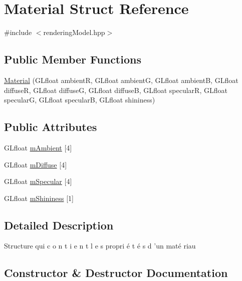 \hypertarget{struct_material}{}\section{Material Struct Reference}
\label{struct_material}


{\ttfamily \#include $<$rendering\+Model.\+hpp$>$}

\subsection*{Public Member Functions}
\begin{DoxyCompactItemize}
\item 
\hyperlink{struct_material_ad2dfa8adf3cec0143e3f804c47588b8c}{Material} (G\+Lfloat ambientR, G\+Lfloat ambientG, G\+Lfloat ambientB, G\+Lfloat diffuseR, G\+Lfloat diffuseG, G\+Lfloat diffuseB, G\+Lfloat specularR, G\+Lfloat specularG, G\+Lfloat specularB, G\+Lfloat shininess)
\end{DoxyCompactItemize}
\subsection*{Public Attributes}
\begin{DoxyCompactItemize}
\item 
G\+Lfloat \hyperlink{struct_material_a9df39adc76f8131ff7c071339bd09eac}{m\+Ambient} \mbox{[}4\mbox{]}
\item 
G\+Lfloat \hyperlink{struct_material_acedb2e5253e0891df7870845793f5ca2}{m\+Diffuse} \mbox{[}4\mbox{]}
\item 
G\+Lfloat \hyperlink{struct_material_a1cab5986665fe4aaa3c9657ad513f596}{m\+Specular} \mbox{[}4\mbox{]}
\item 
G\+Lfloat \hyperlink{struct_material_a6b74b1568a229d6f3306ce9c127ae256}{m\+Shininess} \mbox{[}1\mbox{]}
\end{DoxyCompactItemize}


\subsection{Detailed Description}
Structure qui c o n t i e n t l e s propri é t é s d ’un maté riau 

\subsection{Constructor \& Destructor Documentation}

